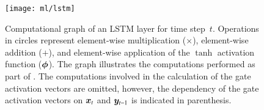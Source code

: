 \begin{figure}[htbp]
  \centering

  \texttt{[image: ml/lstm]}

  \caption{Computational graph of an LSTM layer for time step~$t$. Operations in
    circles represent element-wise multiplication ($\times$), element-wise
    addition ($+$), and element-wise application of the $\tanh$ activation
    function ($\bm{\phi}$). The graph illustrates the computations performed
    as part of . The computations
    involved in the calculation of the gate activation vectors are omitted,
    however, the dependency of the gate activation vectors on $\bm{x}_{t}$
    and $\bm{y}_{t - 1}$ is indicated in parenthesis.}%
  \label{fig:lstm}
\end{figure}



